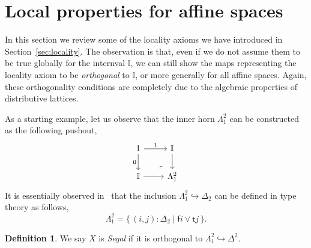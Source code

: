 \documentclass[12pt]{amsart}
\newtheorem{theorem}{Theorem}[section]
\theoremstyle{definition}
\newtheorem{definition}[theorem]{Definition}
\newcommand{\mbb}[1]{\mathbb{#1}}
\newcommand{\I}{\mbb I}
\newcommand{\ms}[1]{\mathsf{#1}}
\newcommand{\scomp}[2]{\{\,#1\mid#2\,\}}
\newcommand{\hook}{\hookrightarrow}
\newcommand{\eq}{\leftrightarrow}
\begin{document}



\section{Local properties for affine spaces}

In this section we review some of the locality axioms we have introduced in Section~\ref{sec:locality}. The observation is that, even if we do not assume them to be true globally for the internval $\I$, we can still show the maps representing the locality axiom to be \emph{orthogonal} to $\I$, or more generally for all affine spaces. Again, these orthogonality conditions are completely due to the algebraic properties of distributive lattices. 

As a starting example, let us observe that the inner horn $\Lambda^2_1$ can be constructed as the following pushout,
\[
  \begin{tikzcd}
    1 \ar[d, "0"'] \ar[r, "1"] & \I \ar[d] \\
    \I \ar[r] & \Lambda^2_1
    \arrow["\lrcorner"{anchor=center, pos=0.125, rotate=180}, draw=none, from=2-2, to=1-1]
  \end{tikzcd}
\]
It is essentially observed in~\cite{riehl2017type} that the inclusion $\Lambda^2_1 \hook \Delta_2$ can be defined in type theory as follows,
\[ \Lambda^2_1 = \scomp{(i,j) : \Delta_2}{\ms fi \vee \ms tj}. \]

\begin{definition}
  We say $X$ is \emph{Segal} if it is orthogonal to $\Lambda^2_1 \hook \Delta^2$.
\end{definition}
\end{document}
